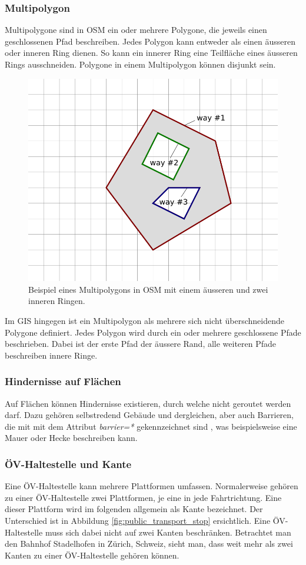 \subsubsection{Multipolygon}
\label{Multipolygon}

Multipolygone sind in \ac{OSM} ein oder mehrere Polygone, die jeweils einen geschlossenen Pfad beschreiben. Jedes Polygon kann entweder als einen äusseren oder inneren Ring dienen. So kann ein innerer Ring eine Teilfläche eines äusseren Rings ausschneiden. Polygone in einem Multipolygon können disjunkt sein. \cite{osm_wiki_multipolygon}

\begin{figure}[th]
\centering
\includegraphics[width=0.5\linewidth]{technicalreport/img/multipolygon_osm_example.png}
\caption[Multipolygon OSM Example]{Beispiel eines Multipolygons in \ac{OSM} mit einem äusseren und zwei inneren Ringen. \cite{osm_wiki_multipolygon}}
\label{fig:multipolygon_osm_example}
\end{figure}

Im \ac{GIS} hingegen ist ein Multipolygon als mehrere sich nicht überschneidende Polygone definiert. Jedes Polygon wird durch ein oder mehrere geschlossene Pfade beschrieben. Dabei ist der erste Pfad der äussere Rand, alle weiteren Pfade beschreiben innere Ringe. \cite{opengis_simple_features}

\subsubsection{Hindernisse auf Flächen}
\label{Hindernisse in Flächen}

Auf Flächen können Hindernisse existieren, durch welche nicht geroutet werden darf. Dazu gehören selbstredend Gebäude und dergleichen, aber auch Barrieren, die mit  mit dem Attribut \textit{barrier=*} gekennzeichnet sind \cite{osm_wiki_barrier}, was beispielsweise eine Mauer oder Hecke beschreiben kann.

\subsubsection{ÖV-Haltestelle und Kante}
\label{ÖV-Haltestelle und Kante}
Eine ÖV-Haltestelle kann mehrere Plattformen umfassen. Normalerweise gehören zu einer ÖV-Haltestelle zwei Plattformen, je eine in jede Fahrtrichtung. Eine dieser Plattform wird im folgenden allgemein als Kante bezeichnet. Der Unterschied ist in Abbildung \ref{fig:public_transport_stop} ersichtlich. Eine ÖV-Haltestelle muss sich dabei nicht auf zwei Kanten beschränken. Betrachtet man den Bahnhof Stadelhofen in Zürich, Schweiz, sieht man, dass weit mehr als zwei Kanten zu einer ÖV-Haltestelle gehören können.

